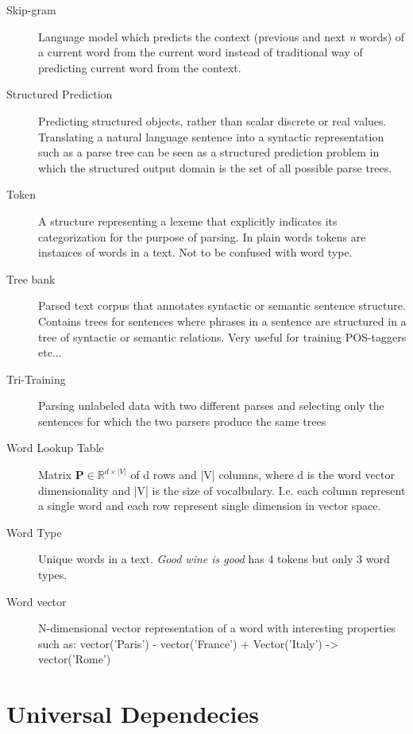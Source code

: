 \documentclass[12pt,a4paper,english
]{tutthesis}
\begin{document}
\begin{description}
\item[Skip-gram] Language model which predicts the context (previous and next \textit{n} words) of a current word from the current word instead of traditional way of predicting current word from the context.

\item[Structured Prediction] Predicting structured objects, rather than scalar discrete or real values. Translating a natural language sentence into a syntactic representation such as a parse tree can be seen as a structured prediction problem in which the structured output domain is the set of all possible parse trees.

\item[Token] A structure representing a lexeme that explicitly indicates its categorization for the purpose of parsing. In plain words tokens are instances of words in a text. Not to be confused with word type.

\item[Tree bank] Parsed text corpus that annotates syntactic or semantic sentence structure. Contains trees for sentences where phrases in a sentence are structured in a tree of syntactic or semantic relations. Very useful for training POS-taggers etc...

\item[Tri-Training] Parsing unlabeled data with two different parses and selecting only the sentences for which the two parsers produce the same trees \cite{Weiss2015}

\item[Word Lookup Table] Matrix $\textbf{P} \in \mathbb{R}^{d \times |V|}$ of d rows and |V| columns, where d is the word vector dimensionality and |V| is the size of vocalbulary. I.e. each column represent a single word and each row represent single dimension in vector space.

\item[Word Type] Unique words in a text. \textit{Good wine is good} has 4 tokens but only 3 word types.

\item[Word vector] N-dimensional vector representation of a word with interesting properties such as: vector('Paris') - vector('France') + Vector('Italy') -> vector('Rome')
\end{description}

\section{Universal Dependecies}
\end{document}
